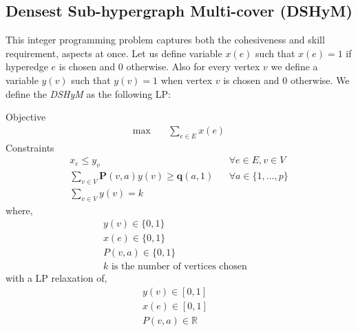\documentclass[conference]{IEEEtran}
\begin{document}
\subsection{Densest Sub-hypergraph Multi-cover (DSHyM)}

This integer programming problem captures both the cohesiveness and skill requirement, aspects at once. Let us define variable $x(e)$ such that $x(e)=1$ if hyperedge $e$ is chosen and $0$ otherwise. Also for every vertex $v$ we define a variable $y(v)$ such that $y(v)=1$ when vertex $v$ is chosen and $0$ otherwise. We define the \textit{DSHyM} as the following LP:

\setcounter{equation}{0}
Objective
\begin{align}
\max \quad
& \sum_{e\in E}  x(e)
\end{align}
Constraints
\begin{align}
x_e \leq y_v && \forall e\in E, v\in V \\
\sum_{v \in V} \mathbf{P}(v,a)y(v) \geq \mathbf{q}(a,1) && \forall a\in \{1,...,p\}\\
\sum_{v \in V} y(v) = k
\end{align}
where,
\begin{align}
y(v)\in \{0,1\} &  \\
x(e)\in \{0,1\} & \\
P(v,a)\in \{0,1\}  & \\
k\text{ is the number of vertices chosen}
\end{align}
with  a LP relaxation of,
\begin{align}
y(v)\in [0,1] &  \\
x(e)\in [0,1] & \\
P(v,a)\in \mathbb{R}
\end{align}
\end{document}
